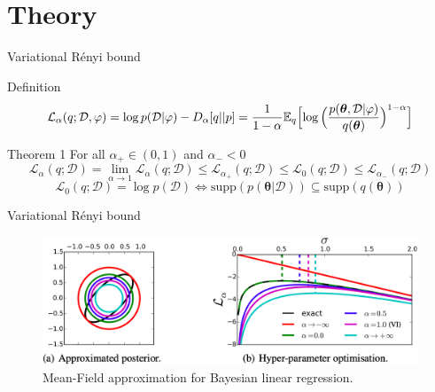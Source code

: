 \documentclass{beamer}
\begin{document}
\section{Theory}
\begin{frame}{Variational Rényi bound}
    \begin{block}{Definition}
    \begin{equation} \mathcal{L}_{\alpha}(q; \mathcal{D}, \varphi) = \log{p (\mathcal{D}| \varphi)} - D_\alpha [q || p] = \dfrac{1}{1-\alpha} \mathbb{E}_q \Bigl[ \log{ \Bigl( \dfrac{p(\boldsymbol{\theta}, \mathcal{D} | \varphi) }{q(\boldsymbol{\theta})} \Bigr)^{1-\alpha} } \Bigr]
    \end{equation} 

    \end{block}
    \begin{block}{Theorem 1}
    For all $\alpha_+ \in  (0, 1)$ and $\alpha_- < 0$
    \begin{equation}
        \mathcal{L}_{\alpha} (q; \mathcal{D}) = \lim\limits_{\alpha \to 1} \mathcal{L}_\alpha (q; \mathcal{D}) \le \mathcal{L}_{\alpha_+} (q; \mathcal{D}) \le \mathcal{L}_0 (q; \mathcal{D}) \le \mathcal{L}_{\alpha_-} (q; \mathcal{D})
    \end{equation} 
    \begin{equation}
        \mathcal{L}_0 (q; \mathcal{D}) = \log p(\mathcal{D}) \Leftrightarrow \text{supp}{(p(\boldsymbol{\theta} | \mathcal{D}))} \subseteq \text{supp}{(q(\boldsymbol{\theta}))} 
    \end{equation}
    \end{block}
    
\end{frame}


\begin{frame}{Variational Rényi bound}
    \begin{figure}
        \centering
        \includegraphics[scale=0.24]{normal.png}
        \caption{Mean-Field approximation for Bayesian linear regression.}
        \label{fig:enter-label}
    \end{figure}
\end{frame}
\end{document}
